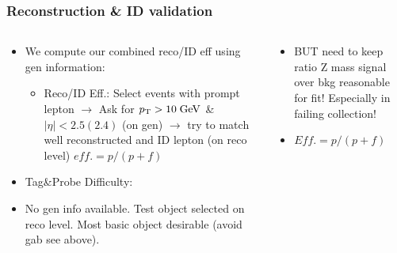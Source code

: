 \documentclass{beamer}
\begin{document}
\begin{frame}
 \frametitle{Reconstruction \& ID validation}
 
   \begin{columns}
 \begin{column}{0.50\textwidth}
 
   \begin{itemize}
  \item We compute our combined reco/ID eff using gen information:
  \begin{itemize}
   \item Reco/ID Eff.: Select events with prompt lepton $\rightarrow$ Ask for $p_{\text{T}}>10\;\text{Ge}\kern-0.06667em\text{V}$ \& $|\eta|<2.5(2.4)$ (on gen) $\rightarrow$ try to match well reconstructed and ID lepton (on reco level) $eff.=p/(p+f)$
  \end{itemize}
  \item Tag\&Probe Difficulty:
  \item No gen info available. Test object selected on reco level. Most basic object desirable (avoid gab see above).
  \end{itemize}
 \end{column}
  \begin{column}{0.50\textwidth}
\begin{itemize}
 \item BUT need to keep ratio Z mass signal over bkg reasonable for fit! Especially in failing collection!
 \item $Eff. = p / (p + f)$  
\end{itemize}
  \end{column}
 \end{columns}
\end{frame}
\end{document}
